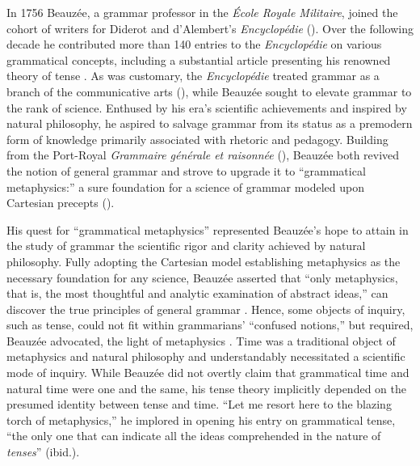 \documentclass[english,output=paper,colorlinks,citecolor=brown]{../langscibook}
\begin{document}
 In 1756 Beauzée, a grammar professor in the \textit{École Royale Militaire}, joined the cohort of writers for Diderot and d’Alembert’s \textit{Encyclopédie} (\citealt{Le-Guern2009}). Over the following decade he contributed more than 140 entries to the \textit{Encyclopédie} on various grammatical concepts, including a substantial article presenting his renowned theory of tense \citep{Beauzée1765}. As was customary, the \textit{Encyclopédie} treated grammar as a branch of the communicative arts (\citealt{DAlembertDiderot1751}), while Beauzée sought to elevate grammar to the rank of science. Enthused by his era’s scientific achievements and inspired by natural philosophy, he aspired to salvage grammar from its status as a premodern form of knowledge primarily associated with rhetoric and pedagogy. Building from the Port-Royal \textit{Grammaire générale et raisonnée} (\citealt{ArnauldLancelot1660}), Beauzée both revived the notion of general grammar and strove to upgrade it to “grammatical metaphysics:” a sure foundation for a science of grammar modeled upon Cartesian precepts (\citealt{Chalozin-Dovrat2019Beauzee}).
 
 His quest for “grammatical metaphysics” represented Beauzée’s hope to attain in the study of grammar the scientific rigor and clarity achieved by natural philosophy. Fully adopting the Cartesian model establishing metaphysics as the necessary foundation for any science, Beauzée asserted that “only metaphysics, that is, the most thoughtful and analytic examination of abstract ideas,” can discover the true principles of general grammar \citep[vol.1: xxxiij–xxxv]{Beauzée1767}. Hence, some objects of inquiry, such as tense, could not fit within grammarians’ “confused notions,” but required, Beauzée advocated, the light of metaphysics \citep[96]{Beauzée1767}. Time was a traditional object of metaphysics and natural philosophy and understandably necessitated a scientific mode of inquiry. While Beauzée did not overtly claim that grammatical time and natural time were one and the same, his tense theory implicitly depended on the presumed identity between tense and time. “Let me resort here to the blazing torch of metaphysics,” he implored in opening his entry on grammatical tense, “the only one that can indicate all the ideas comprehended in the nature of \textit{tenses}” (ibid.).
 
\end{document}
